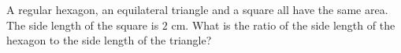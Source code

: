 A regular hexagon, an equilateral triangle and a square all have the same area. The side length of the square is $2$ cm. What is the ratio of the side length of the hexagon to the side length of the triangle?
